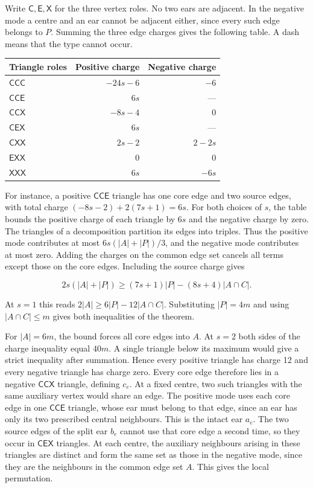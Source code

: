 \documentclass[english,11pt,a4paper]{article}
\newcounter{none}
\begin{document}
Write \(\mathsf C,\mathsf E,\mathsf X\) for the three vertex roles. No two ears are adjacent. In the negative mode a centre and an ear cannot be adjacent either, since every such edge belongs to \(P\). Summing the three edge charges gives the following table. A dash means that the type cannot occur.

{\def\LTcaptype{none} %
\begin{longtable}[]{@{}lrr@{}}
\toprule\noalign{}
Triangle roles & Positive charge & Negative charge \\
\midrule\noalign{}
\endhead
\bottomrule\noalign{}
\endlastfoot
\(\mathsf{CCC}\) & \(-24s-6\) & \(-6\) \\
\(\mathsf{CCE}\) & \(6s\) & --- \\
\(\mathsf{CCX}\) & \(-8s-4\) & \(0\) \\
\(\mathsf{CEX}\) & \(6s\) & --- \\
\(\mathsf{CXX}\) & \(2s-2\) & \(2-2s\) \\
\(\mathsf{EXX}\) & \(0\) & \(0\) \\
\(\mathsf{XXX}\) & \(6s\) & \(-6s\) \\
\end{longtable}
}

For instance, a positive \(\mathsf{CCE}\) triangle has one core edge and two source edges, with total charge \((-8s-2)+2(7s+1)=6s\). For both choices of \(s\), the table bounds the positive charge of each triangle by \(6s\) and the negative charge by zero. The triangles of a decomposition partition its edges into triples. Thus the positive mode contributes at most \(6s(|A|+|P|)/3\), and the negative mode contributes at most zero. Adding the charges on the common edge set cancels all terms except those on the core edges. Including the source charge gives

\[
2s(|A|+|P|)\ge (7s+1)|P|-(8s+4)|A\cap C|.
\]

At \(s=1\) this reads \(2|A|\ge 6|P|-12|A\cap C|\). Substituting \(|P|=4m\) and using \(|A\cap C|\le m\) gives both inequalities of the theorem.

For \(|A|=6m\), the bound forces all core edges into \(A\). At \(s=2\) both sides of the charge inequality equal \(40m\). A single triangle below its maximum would give a strict inequality after summation. Hence every positive triangle has charge 12 and every negative triangle has charge zero. Every core edge therefore lies in a negative \(\mathsf{CCX}\) triangle, defining \(c_e\). At a fixed centre, two such triangles with the same auxiliary vertex would share an edge. The positive mode uses each core edge in one \(\mathsf{CCE}\) triangle, whose ear must belong to that edge, since an ear has only its two prescribed central neighbours. This is the intact ear \(a_e\). The two source edges of the split ear \(b_e\) cannot use that core edge a second time, so they occur in \(\mathsf{CEX}\) triangles. At each centre, the auxiliary neighbours arising in these triangles are distinct and form the same set as those in the negative mode, since they are the neighbours in the common edge set \(A\). This gives the local permutation.
\end{document}
